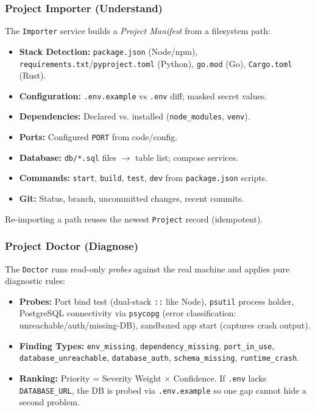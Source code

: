 \documentclass[conference,10pt,caption=false]{IEEEtran}
\begin{document}
\subsubsection{Project Importer (Understand)}
The \texttt{Importer} service builds a \textit{Project Manifest} from a filesystem path:
\begin{itemize}[leftmargin=*, nosep]
    \item \textbf{Stack Detection:} \texttt{package.json} (Node/npm), \texttt{requirements.txt}/\texttt{pyproject.toml} (Python), \texttt{go.mod} (Go), \texttt{Cargo.toml} (Rust).
    \item \textbf{Configuration:} \texttt{.env.example} vs \texttt{.env} diff; masked secret values.
    \item \textbf{Dependencies:} Declared vs. installed (\texttt{node\_modules}, \texttt{venv}).
    \item \textbf{Ports:} Configured \texttt{PORT} from code/config.
    \item \textbf{Database:} \texttt{db/*.sql} files $\to$ table list; compose services.
    \item \textbf{Commands:} \texttt{start}, \texttt{build}, \texttt{test}, \texttt{dev} from \texttt{package.json} scripts.
    \item \textbf{Git:} Status, branch, uncommitted changes, recent commits.
\end{itemize}
Re-importing a path reuses the newest \texttt{Project} record (idempotent).

\subsubsection{Project Doctor (Diagnose)}
\label{sec:doctor}
The \texttt{Doctor} runs read-only \textit{probes} against the real machine and applies pure diagnostic rules:
\begin{itemize}[leftmargin=*, nosep]
    \item \textbf{Probes:} Port bind test (dual-stack \texttt{::} like Node), \texttt{psutil} process holder, PostgreSQL connectivity via \texttt{psycopg} (error classification: unreachable/auth/missing-DB), sandboxed app start (captures crash output).
    \item \textbf{Finding Types:} \texttt{env\_missing}, \texttt{dependency\_missing}, \texttt{port\_in\_use}, \texttt{database\_unreachable}, \texttt{database\_auth}, \texttt{schema\_missing}, \texttt{runtime\_crash}.
    \item \textbf{Ranking:} Priority = Severity Weight $\times$ Confidence. If \texttt{.env} lacks \texttt{DATABASE\_URL}, the DB is probed via \texttt{.env.example} so one gap cannot hide a second problem.
\end{itemize}
\end{document}
